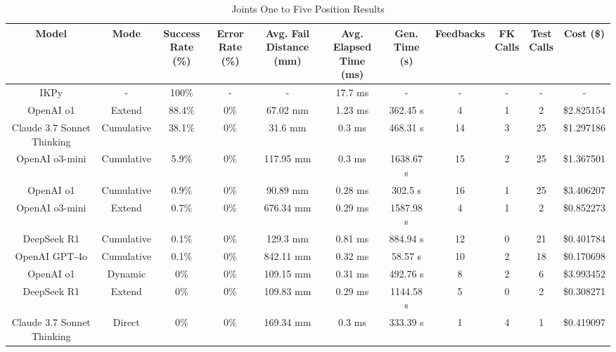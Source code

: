 \begin{landscape}
\begin{table}[H]
\tiny
\renewcommand{\arraystretch}{1.2}
\caption{Joints One to Five Position Results}
\begin{center}
\begin{tabular}{|c|c|c|c|c|c|c|c|c|c|c|}
    \hline
    \textbf{Model} & 
    \textbf{Mode} & 
    \makecell{\textbf{Success}\\\textbf{Rate (\%)}} &
    \makecell{\textbf{Error}\\\textbf{Rate (\%)}} &
    \makecell{\textbf{Avg. Fail}\\\textbf{Distance (mm)}} &
    \makecell{\textbf{Avg. Elapsed}\\\textbf{Time (ms)}} &
    \makecell{\textbf{Gen.}\\\textbf{Time (s)}} &
    \textbf{Feedbacks} &
    \makecell{\textbf{FK}\\\textbf{Calls}} &
    \makecell{\textbf{Test}\\\textbf{Calls}} &
    \textbf{Cost (\$)} \\
    \hline
    IKPy & - & 100\% & - & - & 17.7 ms & - & - & - & - & - \\
    \hline
    OpenAI o1 & Extend & 88.4\% & 0\% & 67.02 mm & 1.23 ms & 362.45 s & 4 & 1 & 2 & \$2.825154 \\
    \hline
    Claude 3.7 Sonnet Thinking & Cumulative & 38.1\% & 0\% & 31.6 mm & 0.3 ms & 468.31 s & 14 & 3 & 25 & \$1.297186 \\
    \hline
    OpenAI o3-mini & Cumulative & 5.9\% & 0\% & 117.95 mm & 0.3 ms & 1638.67 s & 15 & 2 & 25 & \$1.367501 \\
    \hline
    OpenAI o1 & Cumulative & 0.9\% & 0\% & 90.89 mm & 0.28 ms & 302.5 s & 16 & 1 & 25 & \$3.406207 \\
    \hline
    OpenAI o3-mini & Extend & 0.7\% & 0\% & 676.34 mm & 0.29 ms & 1587.98 s & 4 & 1 & 2 & \$0.852273 \\
    \hline
    DeepSeek R1 & Cumulative & 0.1\% & 0\% & 129.3 mm & 0.81 ms & 884.94 s & 12 & 0 & 21 & \$0.401784 \\
    \hline
    OpenAI GPT-4o & Cumulative & 0.1\% & 0\% & 842.11 mm & 0.32 ms & 58.57 s & 10 & 2 & 18 & \$0.170698 \\
    \hline
    OpenAI o1 & Dynamic & 0\% & 0\% & 109.15 mm & 0.31 ms & 492.76 s & 8 & 2 & 6 & \$3.993452 \\
    \hline
    DeepSeek R1 & Extend & 0\% & 0\% & 109.83 mm & 0.29 ms & 1144.58 s & 5 & 0 & 2 & \$0.308271 \\
    \hline
    Claude 3.7 Sonnet Thinking & Direct & 0\% & 0\% & 169.34 mm & 0.3 ms & 333.39 s & 1 & 4 & 1 & \$0.419097 \\

\end{tabular}
\end{center}
\end{table}
\end{landscape}
